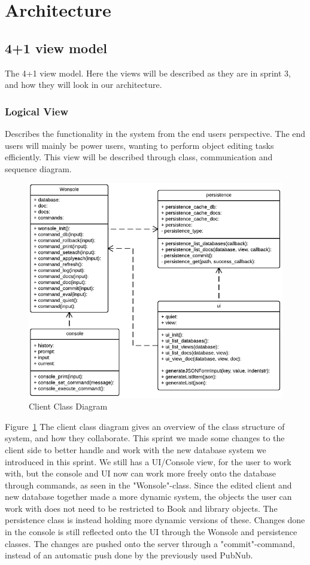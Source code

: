 \section{Architecture}
\subsection{4+1 view model}
The 4+1 view model\cite{Kruchten}. Here the views will be described as they are in sprint 3, and how they will look in our architecture. 

\subsubsection{Logical View}
Describes the functionality in the system from the end users perspective. The end users will mainly be power users, wanting to perform object editing tasks efficiently. This view will be described through class, communication and sequence diagram.

\begin{figure}[h]
\centering
\includegraphics[width=6in]{image/architecture/s3/s3clientClassDiagram.png}
\caption{Client Class Diagram}
\label{figure:s3clientClassDiagram}
\end{figure}

Figure~\ref{figure:s3clientClassDiagram} The client class diagram gives an overview of the class structure of system, and how they collaborate. This sprint we made some changes to the client side to better handle and work with the new database system we introduced in this sprint. We still has a UI/Console view, for the user to work with, but the console and UI now can work more freely onto the database through commands, as seen in the "Wonsole"-class. Since the edited client and new database together made a more dynamic system, the objects the user can work with does not need to be restricted to Book and library objects. The persistence class is instead holding more dynamic versions of these. Changes done in the console is still reflected onto the UI through the Wonsole and persistence classes. The changes are pushed onto the server through a "commit"-command, instead of an automatic push done by the previously used PubNub.

